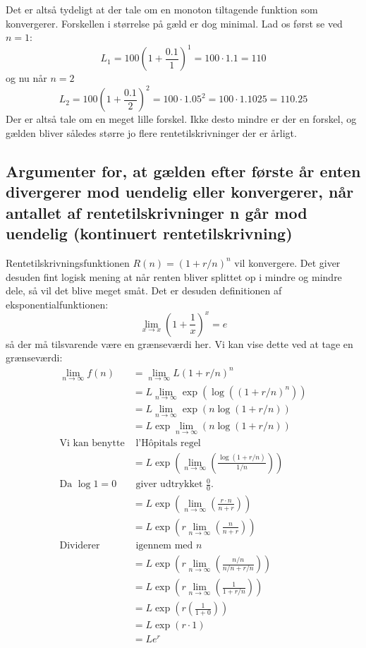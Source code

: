 \documentclass{report}
\begin{document}
Det er altså tydeligt at der tale om en monoton tiltagende funktion som konvergerer. Forskellen i størrelse på gæld er dog minimal. Lad os først se ved $n=1$:\begin{equation}
    L_1=100\left(1+\frac{0.1}{1}\right)^1=100\cdot1.1=110
\end{equation}og nu når $n=2$\begin{equation}
    L_2=100\left(1+\frac{0.1}{2}\right)^2=100\cdot1.05^2=100\cdot1.1025=110.25
\end{equation}Der er altså tale om en meget lille forskel. Ikke desto mindre er der en forskel, og gælden bliver således større jo flere rentetilskrivninger der er årligt.

\subsection{Argumenter for, at gælden efter første år enten divergerer mod uendelig eller konvergerer, når antallet af rentetilskrivninger n går mod uendelig (kontinuert rentetilskrivning)}
Rentetilskrivningsfunktionen $R(n)=(1+r/n)^n$ vil konvergere. Det giver desuden fint logisk mening at når renten bliver splittet op i mindre og mindre dele, så vil det blive meget småt. Det er desuden definitionen af eksponentialfunktionen:$$\lim_{x\to x}\left(1+\frac{1}{x}\right)^x=e$$så der må tilsvarende være en grænseværdi her. Vi kan vise dette ved at tage en grænseværdi:\begin{align*}
    \lim_{n\to\infty}f(n)&=\lim_{n\to\infty}L(1+r/n)^n\\
    &=L\lim_{n\to\infty}\exp{\left(\log{((1+r/n)^n)}\right)}\\
    &=L\lim_{n\to\infty}\exp{\left(n\log{(1+r/n)}\right)}\\
    &=L\exp{\lim_{n\to\infty}\left(n\log{(1+r/n)}\right)}\\
    \text{Vi kan benytte}&\text{ l'Hôpitals regel}\\
    &=L\exp{\left(\lim_{n\to\infty}\left(\frac{\log{(1+r/n)}}{1/n}\right)\right)}\\
    \text{Da }\log{1}=0&\text{ giver udtrykket }\frac{0}{0}.\\
    &=L\exp{\left(\lim_{n\to\infty}\left(\frac{r\cdot n}{n+r}\right)\right)}\\
    &=L\exp{\left(r\lim_{n\to\infty}\left(\frac{n}{n+r}\right)\right)}\\
    \text{Dividerer}&\text{ igennem med }n\\
    &=L\exp{\left(r\lim_{n\to\infty}\left(\frac{n/n}{n/n+r/n}\right)\right)}\\
    &=L\exp{\left(r\lim_{n\to\infty}\left(\frac{1}{1+r/n}\right)\right)}\\
    &=L\exp{\left(r\left(\frac{1}{1+0}\right)\right)}\\
    &=L\exp{(r\cdot1)}\\
    &=Le^{r}
\end{align*}
\end{document}
